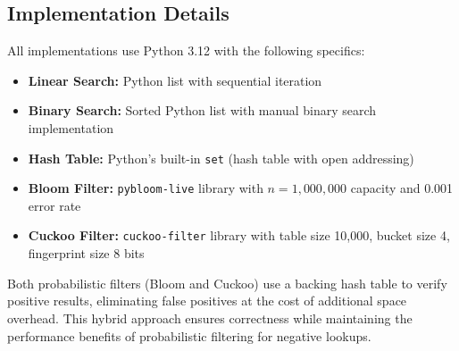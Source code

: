 \subsection{Implementation Details}

All implementations use Python 3.12 with the following specifics:

\begin{itemize}
    \item \textbf{Linear Search:} Python list with sequential iteration
    \item \textbf{Binary Search:} Sorted Python list with manual binary search implementation
    \item \textbf{Hash Table:} Python's built-in \texttt{set} (hash table with open addressing)
    \item \textbf{Bloom Filter:} \texttt{pybloom-live} library with $n=1,000,000$ capacity and 0.001 error rate
    \item \textbf{Cuckoo Filter:} \texttt{cuckoo-filter} library with table size 10,000, bucket size 4, fingerprint size 8 bits
\end{itemize}

Both probabilistic filters (Bloom and Cuckoo) use a backing hash table to verify positive results, eliminating false positives at the cost of additional space overhead. This hybrid approach ensures correctness while maintaining the performance benefits of probabilistic filtering for negative lookups.

